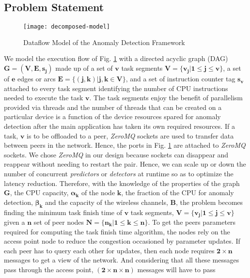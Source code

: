 \subsection{Problem Statement}
\label{subsec:problem-formulation}
\begin{figure}[!t]
	\centering
	\texttt{[image: decomposed-model]}
	\caption{Dataflow Model of the Anomaly 
		Detection Framework}
	\label{fig:dataflow-model}
\end{figure}
We model the execution flow of Fig. \ref{fig:dataflow-model} 
with a directed acyclic graph (DAG) $ \bm{G=(V,E,s_j)} 
$ made up of a set of $ \bm{v} $ task segments $ {
\bm{V=\{v_j|1\leq j\leq v\}}} $, a set of $ \bm{e} $ edges or 
arcs 
$ \bm{E=\{(j,k)|j,k \in V\}} $, and a set of instruction 
counter tag $ \bm{s_v} $ attached to every task segment 
identifying the number of CPU instructions needed to execute 
the task $ \bm{v} $. The task segments enjoy the benefit of 
parallelism provided via threads and the number of threads 
that can be created on a particular device is a function of 
the device resources spared for anomaly detection after the 
main application has taken its own required resources. If a 
task, $ \bm{v} $ is to be offloaded to a peer, \emph{ZeroMQ} 
sockets are used to transfer data between peers in the 
network. Hence, the ports in Fig. \ref{fig:dataflow-model} 
are attached to \emph{ZeroMQ} sockets. We chose \emph{ZeroMQ} 
in our design because sockets can disappear and reappear 
without needing to restart the pair. Hence, we can scale up 
or down the number of concurrent \emph{predictors} or 
\emph{detectors} at runtime so as to optimize the latency 
reduction. Therefore, with the knowledge of the properties of 
the graph $ \bm{G} $, the CPU capacity, $ \bm{\alpha_k} $ of 
the node $ \bm{k} $, the 
fraction of the CPU for anomaly detection, $ \bm{\beta_k} $ 
and 
the capacity of the wireless channels, $ \bm{B} $, the 
problem becomes finding the minimum task finish time of $ 
\bm{v} $ task segments, ${ \bm{V=\{v_j|1\leq j \leq v\}}} $ 
given a $ \bm{n} $ set of peer nodes ${ \bm{N=\{n_k|1 \leq k 
\leq n\}}} $. To get the peers parameters required for 
computing the task finish time algorithm, the nodes 
rely on the access point node to reduce the congestion 
occasioned by parameter updates. If each peer has to query 
each other for updates, then each node requires $ \bm{2 
\times n} $ messages to get a view of the network. And 
considering that all these messages pass through the access 
point, ${ \bm{(2\times n\times n)}} $ messages will have to 
pass 
